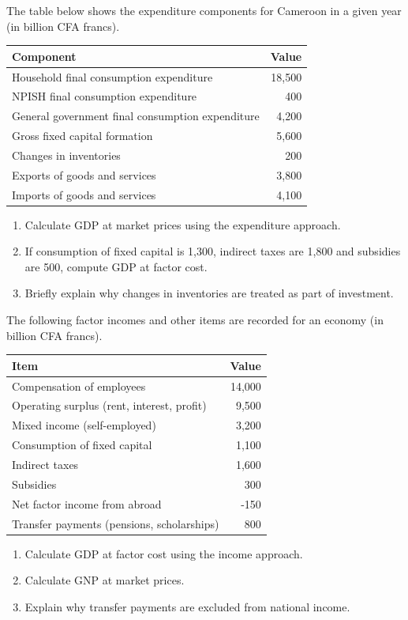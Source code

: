 \documentclass[11pt]{article}
\begin{document}
\begin{exercice}
The table below shows the expenditure components for Cameroon in a given year (in billion CFA francs). 
\begin{center}
\begin{tabular}{|l|r|}
\hline
\textbf{Component} & \textbf{Value} \\
\hline
Household final consumption expenditure & 18,500 \\
NPISH final consumption expenditure & 400 \\
General government final consumption expenditure & 4,200 \\
Gross fixed capital formation & 5,600 \\
Changes in inventories & 200 \\
Exports of goods and services & 3,800 \\
Imports of goods and services & 4,100 \\
\hline
\end{tabular}
\end{center}
\begin{enumerate}
\item Calculate GDP at market prices using the expenditure approach.
\item If consumption of fixed capital is 1,300, indirect taxes are 1,800 and subsidies are 500, compute GDP at factor cost.
\item Briefly explain why changes in inventories are treated as part of investment.
\end{enumerate}
\end{exercice}

\begin{exercice}
The following factor incomes and other items are recorded for an economy (in billion CFA francs).
\begin{center}
\begin{tabular}{|l|r|}
\hline
\textbf{Item} & \textbf{Value} \\
\hline
Compensation of employees & 14,000 \\
Operating surplus (rent, interest, profit) & 9,500 \\
Mixed income (self-employed) & 3,200 \\
Consumption of fixed capital & 1,100 \\
Indirect taxes & 1,600 \\
Subsidies & 300 \\
Net factor income from abroad & -150 \\
Transfer payments (pensions, scholarships) & 800 \\
\hline
\end{tabular}
\end{center}
\begin{enumerate}
\item Calculate GDP at factor cost using the income approach.
\item Calculate GNP at market prices.
\item Explain why transfer payments are excluded from national income.
\end{enumerate}
\end{exercice}
\end{document}

